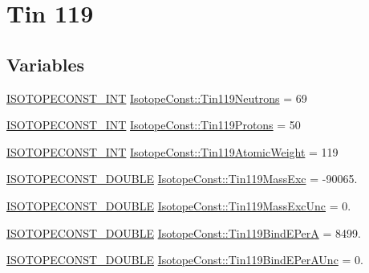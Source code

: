 \hypertarget{group___isotope_const-_tin-_sn119}{}\section{Tin 119}
\label{group___isotope_const-_tin-_sn119}
\subsection*{Variables}
\begin{DoxyCompactItemize}
\item 
\mbox{\hyperlink{group___isotope_const-_macros_ga5f18360b3e99483a35c32d789e62621c}{I\+S\+O\+T\+O\+P\+E\+C\+O\+N\+S\+T\+\_\+\+I\+NT}} \mbox{\hyperlink{group___isotope_const-_tin-_sn119_gae4e6c19acc94b004e9d3b93b3977fd33}{Isotope\+Const\+::\+Tin119\+Neutrons}} = 69
\item 
\mbox{\hyperlink{group___isotope_const-_macros_ga5f18360b3e99483a35c32d789e62621c}{I\+S\+O\+T\+O\+P\+E\+C\+O\+N\+S\+T\+\_\+\+I\+NT}} \mbox{\hyperlink{group___isotope_const-_tin-_sn119_gab389864695aee25d3638fef6e05e0efa}{Isotope\+Const\+::\+Tin119\+Protons}} = 50
\item 
\mbox{\hyperlink{group___isotope_const-_macros_ga5f18360b3e99483a35c32d789e62621c}{I\+S\+O\+T\+O\+P\+E\+C\+O\+N\+S\+T\+\_\+\+I\+NT}} \mbox{\hyperlink{group___isotope_const-_tin-_sn119_gab3a7750cf9e80dd532b0a602e09d63d3}{Isotope\+Const\+::\+Tin119\+Atomic\+Weight}} = 119
\item 
\mbox{\hyperlink{group___isotope_const-_macros_ga8f45a7272ce02c0b4c65c44636ed719a}{I\+S\+O\+T\+O\+P\+E\+C\+O\+N\+S\+T\+\_\+\+D\+O\+U\+B\+LE}} \mbox{\hyperlink{group___isotope_const-_tin-_sn119_gae0ab36aa172b700082dc7b13303cb25f}{Isotope\+Const\+::\+Tin119\+Mass\+Exc}} = -\/90065.
\item 
\mbox{\hyperlink{group___isotope_const-_macros_ga8f45a7272ce02c0b4c65c44636ed719a}{I\+S\+O\+T\+O\+P\+E\+C\+O\+N\+S\+T\+\_\+\+D\+O\+U\+B\+LE}} \mbox{\hyperlink{group___isotope_const-_tin-_sn119_ga31e37da433ba152f34a5e3794ea7505c}{Isotope\+Const\+::\+Tin119\+Mass\+Exc\+Unc}} = 0.
\item 
\mbox{\hyperlink{group___isotope_const-_macros_ga8f45a7272ce02c0b4c65c44636ed719a}{I\+S\+O\+T\+O\+P\+E\+C\+O\+N\+S\+T\+\_\+\+D\+O\+U\+B\+LE}} \mbox{\hyperlink{group___isotope_const-_tin-_sn119_ga9d074b4e8445c5c6030e195303392d7c}{Isotope\+Const\+::\+Tin119\+Bind\+E\+PerA}} = 8499.
\item 
\mbox{\hyperlink{group___isotope_const-_macros_ga8f45a7272ce02c0b4c65c44636ed719a}{I\+S\+O\+T\+O\+P\+E\+C\+O\+N\+S\+T\+\_\+\+D\+O\+U\+B\+LE}} \mbox{\hyperlink{group___isotope_const-_tin-_sn119_gaecc0324d40657e6bccc4d8322d8e150d}{Isotope\+Const\+::\+Tin119\+Bind\+E\+Per\+A\+Unc}} = 0.

\end{DoxyCompactItemize}
